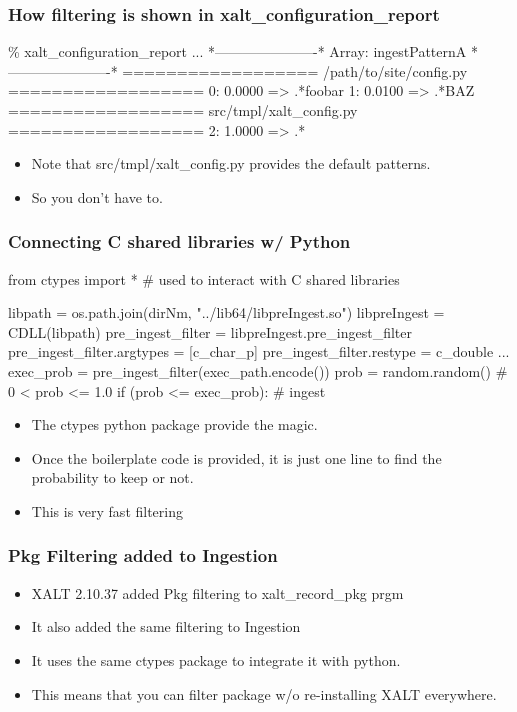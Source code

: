 \documentclass{beamer}
\begin{document}
\begin{frame}[fragile]
    \frametitle{How filtering is shown in xalt\_configuration\_report}
 {\tiny
    \begin{semiverbatim}
\% xalt\_configuration\_report
...        
*----------------------*
 Array: ingestPatternA
*----------------------*
================== /path/to/site/config.py ==================
   0: 0.0000 => .*\/foobar
   1: 0.0100 => .*\/BAZ
================== src/tmpl/xalt\_config.py ==================
   2: 1.0000 => .*
    \end{semiverbatim}
}
  \begin{itemize}
    \item Note that src/tmpl/xalt\_config.py  provides the default
      patterns.
    \item So you don't have to.
  \end{itemize}

\end{frame}

\begin{frame}[fragile]
    \frametitle{Connecting C shared libraries w/ Python}
 {\tiny
    \begin{semiverbatim}
from   ctypes import *   # used to interact with C shared libraries

libpath      = os.path.join(dirNm, "../lib64/libpreIngest.so")
libpreIngest = CDLL(libpath)
pre\_ingest\_filter = libpreIngest.pre\_ingest\_filter
pre\_ingest\_filter.argtypes = [c\_char\_p]
pre\_ingest\_filter.restype  = c\_double
...
exec\_prob = pre\_ingest\_filter(exec\_path.encode())
prob      = random.random() # 0 < prob <= 1.0
if (prob <= exec\_prob):
   # ingest

    \end{semiverbatim}
}
  \begin{itemize}
    \item The ctypes python package provide the magic.
    \item Once the boilerplate code is provided, it is just one line
      to find the probability to keep or not.
    \item This is very fast filtering 
  \end{itemize}
\end{frame}

\begin{frame}[fragile]
    \frametitle{Pkg Filtering added to Ingestion}
  \begin{itemize}
    \item XALT 2.10.37 added Pkg filtering to xalt\_record\_pkg prgm
    \item It also added the same filtering to Ingestion 
    \item It uses the same ctypes package to integrate it with python.
    \item This means that you can filter package w/o re-installing
      XALT everywhere.
  \end{itemize}
\end{frame}
\end{document}
